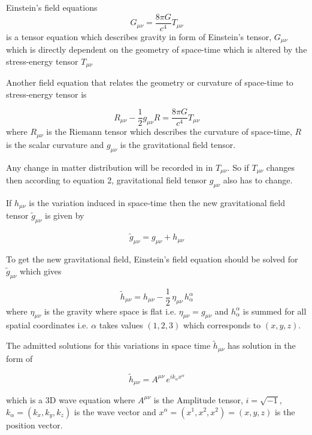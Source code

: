 Einstein's field equations 
\begin{equation}
    G_{\mu\nu}= \frac{8 \pi  G}{c^{4}}  T_{\mu\nu}
\end{equation}
is a tensor equation which describes gravity in form of Einstein's tensor, $G_{\mu\nu}$ which is directly dependent on the geometry of space-time which is altered by the stress-energy tensor $T_{\mu\nu}$

Another field equation that relates the geometry or curvature of space-time to stress-energy tensor is 

\begin{equation}
    R_{\mu\nu}-\frac{1}{2}g_{\mu\nu}R=\frac{8\pi G}{c^{4}}T_{\mu\nu}
\end{equation}
where $R_{\mu\nu}$ is the Riemann tensor which describes the curvature of space-time, $R$ is the scalar curvature and $g_{\mu\nu}$ is the gravitational field tensor.

Any change in matter distribution will be recorded in in $T_{\mu\nu}$. So if $T_{\mu\nu}$ changes then according to equation 2, gravitational field tensor $g_{\mu\nu}$ also has to change. 

If $h_{\mu\nu}$ is the variation induced in space-time then the new gravitational field tensor $\tilde{g}_{\mu\nu}$ is given by 

\begin{equation}
    \tilde{g}_{\mu\nu} = g_{\mu\nu} + h_{\mu\nu}
\end{equation}

To get the new gravitational field, Einstein's field equation should be solved for $\tilde{g}_{\mu\nu}$ which gives 

\begin{equation}
    \tilde{h}_{\mu\nu} = h_{\mu\nu} - \frac{1}{2} \, \eta_{\mu\nu} \, h^{\alpha}_{\alpha}
\end{equation}
 where $\eta_{\mu\nu}$ is the gravity where space is flat i.e. $\eta_{\mu\nu} = g_{\mu\nu}$ and $h^{\alpha}_{\alpha}$ is summed for all spatial coordinates i.e. $\alpha$ takes values $(1,2,3) $ which corresponds to $(x,y,z)$.
 
 The admitted solutions for this variations in space time $\tilde{h}_{\mu\nu}$ has solution in the form of 
 
 \begin{equation}
     \tilde{h}_{\mu\nu} = A^{\mu\nu}\, e^{ik_{\alpha}x^{\alpha}}
 \end{equation}
 
 which is a 3D wave equation where $A^{\mu\nu}$ is the Amplitude tensor, $i = \sqrt{-1} $, $k_{\alpha} = (k_{x},k_{y},k_{z})$ is the wave vector and $x^{\alpha} = (x^{1},x^{2},x^{2}) = (x,y,z)$ is the position vector.